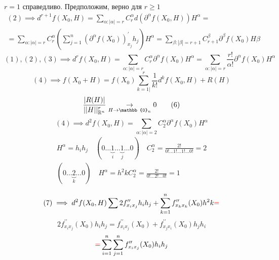 \documentclass[main]{subfiles}
\begin{document}
        \begin{longProof}[по индукции]
            $r = 1$ справедливо. Предположим, верно для $r \geq 1$ 
            \begin{multline*}
                (2) \implies d^{r+1}f(X_0, H) = \sum_{\alpha: |\alpha| = r} C^\alpha_r d(\partial^\alpha f(X_0,H))H^\alpha = \\
                = \sum_{\alpha: |\alpha| = r} C^\alpha_r \left( \sum^n_{j=1} (\partial^\alpha f(X_0))^\prime_{x_j}h_j \right)H^\alpha = \sum_{\beta: |\beta| = r+1} C_{r+1}^\beta \partial^\beta f(X_0) H \beta 
            \end{multline*}
            \[ (1), (2), (3) \implies d^r f(X_0,H) = \sum_{\alpha: |\alpha| = r} C^\alpha_r \partial^\alpha f(X_0) H^\alpha = \sum_{\alpha: |\alpha|=r} \frac{r!}{\alpha!} \partial^\alpha f(X_0) H^\alpha \tag{4} \] 
            \[ (4) \implies f(X_0 + H) = f(X_0) \sum^r_{k=1|} \frac{1}{k!} d^k f(X_0, H) + R(H) \tag{5} \]
            \[ \frac{|R(H)|}{||H||^r_{\vR^n}} \underset{H \to \mathbb{0}_n}{\rightarrow} 0 \tag{6} \]
            \[ (4) \implies d^2f(X_0, H) = \sum_{\alpha : |\alpha| = 2} C^\alpha_2 \partial^\alpha f(X_0)H^\alpha \tag{7} \] 
            \begin{gather*}
                H^\alpha = h_i h_j \quad (0 \ldots \underbrace{1}_i \ldots \underbrace{1}_j \ldots 0) \quad C^\alpha_2 = \frac{2!}{0! \ldots 1! \ldots 1! \ldots 0!} = 2 \\
                (0 \ldots \underbrace{2}_k \ldots 0) \quad H^\alpha = h^2k C^\alpha_2 = \frac{2!}{0! \ldots 2! \ldots 0!} = 1 \\
            \end{gather*}
               \[ (7) \implies d^2 f(X_0, H) \sum 2 f^{\prime\prime}_{x_ix_j} h_i h_j + \sum^n_{k=1}f^{\prime\prime}_{x_kx_k}(X_0)h^2 k \textcolor{red}{ =} \] 
               \[ 2f^{\prime\prime}_{x_ix_j}(X_0) h_ih_j = f^{\prime\prime}_{x_ix_j}(X_0) + f^{\prime\prime}_{x_jx_i}(X_0)h_j h_i \tag{8} \]
               \[ \textcolor{red}{ = } \sum^n_{i=1} \sum^n_{j=1} f^{\prime\prime}_{x_ix_j}(X_0) h_i h_j \]
        \end{longProof}
\end{document}
